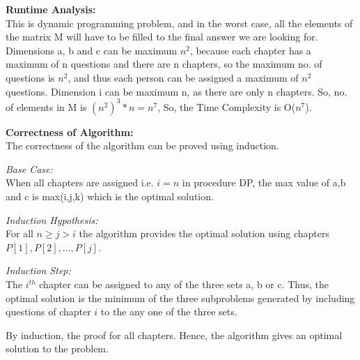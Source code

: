 \documentclass[a4paper]{article}
\begin{document}
    \textbf{Runtime Analysis:}\\
    This is dynamic programming problem, and in the worst case, all the elements of the matrix M will have to be filled to the final answer we are looking for. Dimensions a, b and c can be maximum $n^2$, because each chapter has a maximum of n questions and there are n chapters, so the maximum no. of questions is $n^2$, and thus each person can be assigned a maximum of $n^2$ questions. Dimension i can be maximum n, as there are only n chapters. So, no. of elements in M is $(n^2)^3*n = n^7$, So, the Time Complexity is O($n^7$).
    
    \textbf{Correctness of Algorithm:}\\
    The correctness of the algorithm can be proved using induction.
    
    
    \textit{Base Case:}\\
    When all chapters are assigned i.e. $i=n$ in procedure DP, the max value of a,b and c is max(i,j,k) which is the optimal solution.
    
    
    \textit{Induction Hypothesis:}\\
    For all $n \geq j > i$ the algorithm provides the optimal solution using chapters $P[1],P[2],...,P[j]$. 
    
    \textit{Induction Step:}\\
    The $i^{th}$ chapter can be assigned to any of the three sets a, b or c. Thus, the optimal solution is the minimum of the three subproblems generated by including questions of chapter $i$ to the any one of the three sets. 
    
    By induction, the proof for all chapters. Hence, the algorithm gives an optimal solution to the problem.
    
    \hfill\qedsymbol
    
\newpage
\end{document}
